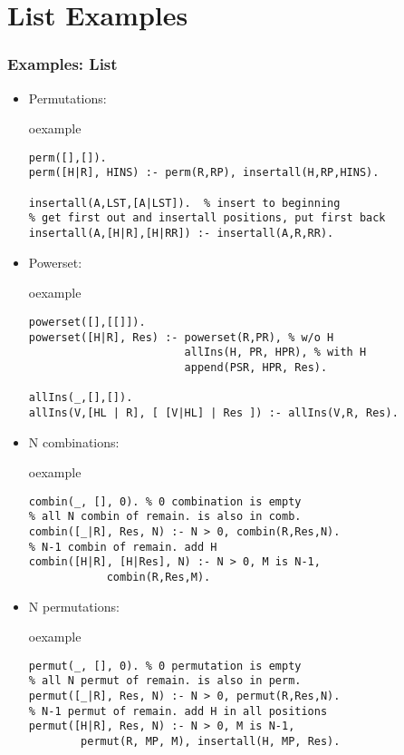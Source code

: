 \section{List Examples}
\begin{frame}[fragile]
\frametitle{Examples: List}
\begin{itemize}
\item Permutations:\\
\begin{beamercolorbox}{oexample}
\begin{lstlisting}[escapeinside=`']
% insert H to all positions in the remainder permutations
perm([],[]).
perm([H|R], HINS) :- perm(R,RP), insertall(H,RP,HINS).

insertall(A,LST,[A|LST]).  % insert to beginning
% get first out and insertall positions, put first back
insertall(A,[H|R],[H|RR]) :- insertall(A,R,RR). 
\end{lstlisting}
\end{beamercolorbox}
\item Powerset:\\
\begin{beamercolorbox}{oexample}
\begin{lstlisting}[escapeinside=`']
powerset([],[[]]).
powerset([H|R], Res) :- powerset(R,PR), % w/o H
                        allIns(H, PR, HPR), % with H
                        append(PSR, HPR, Res).

allIns(_,[],[]).
allIns(V,[HL | R], [ [V|HL] | Res ]) :- allIns(V,R, Res).
\end{lstlisting}
\end{beamercolorbox}
\end{itemize}
\end{frame}

\begin{frame}[fragile]
\begin{itemize}
\item N combinations:\\
\begin{beamercolorbox}{oexample}
\begin{lstlisting}[escapeinside=`']
combin(_, [], 0). % 0 combination is empty
% all N combin of remain. is also in comb.
combin([_|R], Res, N) :- N > 0, combin(R,Res,N).
% N-1 combin of remain. add H
combin([H|R], [H|Res], N) :- N > 0, M is N-1, 
            combin(R,Res,M).
\end{lstlisting}
\end{beamercolorbox}
\item N permutations:\\
\begin{beamercolorbox}{oexample}
\begin{lstlisting}[escapeinside=`']
permut(_, [], 0). % 0 permutation is empty
% all N permut of remain. is also in perm.
permut([_|R], Res, N) :- N > 0, permut(R,Res,N).
% N-1 permut of remain. add H in all positions
permut([H|R], Res, N) :- N > 0, M is N-1, 
        permut(R, MP, M), insertall(H, MP, Res).
\end{lstlisting}
\end{beamercolorbox}
\end{itemize}
\end{frame}

